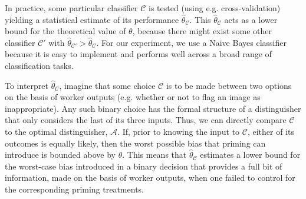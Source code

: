 \documentclass[letterpaper]{article}
\begin{document}
In practice, some particular classifier $\mathcal{C}$ is tested (using e.g. 
cross-validation) yielding a statistical estimate of its performance 
$\hat{\theta}_\mathcal{C}$. This
$\hat{\theta}_\mathcal{C}$ acts as a lower bound for the 
theoretical value of $\theta$, because there might 
exist some other classifier $\mathcal{C}'$ with 
$\hat{\theta}_\mathcal{C'}>\hat{\theta}_\mathcal{C}$.
For our experiment, we use a Naive Bayes classifier because it is easy to
implement and performs well across a broad range of classification tasks.

To interpret $\hat{\theta}_\mathcal{C}$, imagine that some choice 
$\mathcal{C}$ is to be made between two options on the basis of worker 
outputs (e.g. whether or not to flag an image as inappropriate). Any such 
binary choice has the formal structure of a distinguisher that only considers 
the last of its three inputs. Thus, we can directly compare $\mathcal{C}$ to 
the optimal distinguisher, $\mathcal{A}$.  If, prior to knowing the input to 
$\mathcal{C}$, either of its outcomes is equally likely, then the worst 
possible bias that priming can introduce is bounded above by $\theta$. 
This means that $\hat{\theta}_\mathcal{C}$ estimates a 
lower bound for the worst-case bias introduced in a binary 
decision that provides a full bit of information, made on the basis of worker 
outputs, when one failed to control for the corresponding priming treatments.
\end{document}
